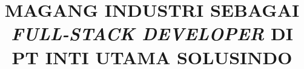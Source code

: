 \title{
    {\fontsize{22pt}{40pt}\selectfont
            MAGANG INDUSTRI SEBAGAI \textit{FULL-STACK DEVELOPER} DI PT INTI UTAMA SOLUSINDO}
}

\newcommand{\documenttitle}{
    \MakeUppercase{
        \jenisMBKM\@
        SEBAGAI\\
        \textit{\jobposition}\\
        DI\@ \company\\
    }
}

\newcommand{\smalldocumenttitle}{\jenisMBKM\ sebagai \jobposition\ di \company}

\newcommand{\authorname}{Aldian Yohanes}
\newcommand{\authornim}{535230139}
\newcommand{\studyprogram}{Teknik Informatika}
\newcommand{\faculty}{Teknologi Informasi}
\newcommand{\semester}{GENAP}
\newcommand{\academicperiod}{2025-2026}

\newcommand{\jobposition}{Full-Stack Developer}
\newcommand{\jobdepartment}{NPD Pharmalogic / Hospinet Platform}
\newcommand{\company}{PT Inti Utama Solusindo}
\newcommand{\jenisMBKM}{Magang Industri}
\newcommand{\lamaMBKM}{12 bulan}
\newcommand{\mentor}{Dimas Aditya Nugroho}
\newcommand{\dosen}{Viny Christanti Mawardi, M.Kom.}
\newcommand{\koordinator}{Tony, Ph.D.}
\newcommand{\city}{Jakarta}
\newcommand{\signaturedate}{13 Juli 2026}
\newcommand{\reportmonth}{Juni}
\newcommand{\reportyear}{2026}
\newcommand{\jenisdokumen}{LAPORAN AKHIR }